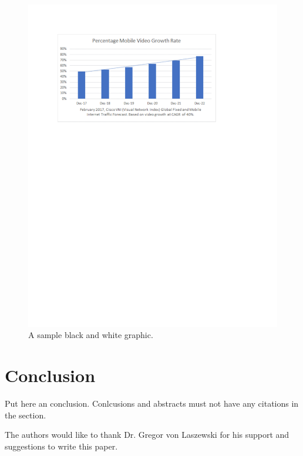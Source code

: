 \documentclass[sigconf]{acmart}
\begin{document}
\begin{figure}
\includegraphics[width=\columnwidth]{images/graph}
\caption{A sample black and white graphic. \cite{??}}
\label{F:graph}
\end{figure}



\section{Conclusion}

Put here an conclusion. Conlcusions and abstracts must not have any
citations in the section.


\begin{acks}

  The authors would like to thank Dr. Gregor von Laszewski for his
  support and suggestions to write this paper.

\end{acks}


 
\end{document}
